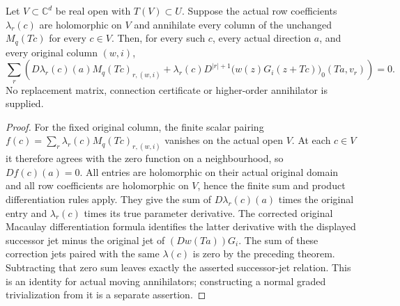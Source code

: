 \begin{theorem}
\label{hir:actual-moving-macaulay-annihilator-successor-connection}
\leanok
Let $V\subset\mathbb C^d$ be real open with $T(V)\subset U$. Suppose
the actual row coefficients $\lambda_r(c)$ are holomorphic on $V$ and
annihilate every column of the unchanged $M_q(Tc)$ for every $c\in V$.
Then, for every such $c$, every actual direction $a$, and every
original column $(w,i)$,
\[
 \sum_r\left(
 D\lambda_r(c)(a)M_q(Tc)_{r,(w,i)}+
 \lambda_r(c)D^{|r|+1}
 \bigl(w(z)G_i(z+Tc)\bigr)_0(Ta,v_r)
 \right)=0.
\]
No replacement matrix, connection certificate or higher-order
annihilator is supplied.
\end{theorem}
\begin{proof}
For the fixed original column, the finite scalar pairing
$f(c)=\sum_r\lambda_r(c)M_q(Tc)_{r,(w,i)}$ vanishes on the actual
open $V$. At each $c\in V$ it therefore agrees with the zero function
on a neighbourhood, so $Df(c)(a)=0$. All entries are holomorphic on
their actual original domain and all row coefficients are holomorphic
on $V$, hence the finite sum and product differentiation rules apply.
They give the sum of $D\lambda_r(c)(a)$ times the original entry and
$\lambda_r(c)$ times its true parameter derivative. The corrected
original Macaulay differentiation formula identifies the latter
derivative with the displayed successor jet minus the original jet
of $(Dw(Ta))G_i$. The sum of these correction jets paired with the
same $\lambda(c)$ is zero by the preceding theorem. Subtracting that
zero sum leaves exactly the asserted successor-jet relation. This is
an identity for actual moving annihilators; constructing a normal
graded trivialization from it is a separate assertion.
\end{proof}
